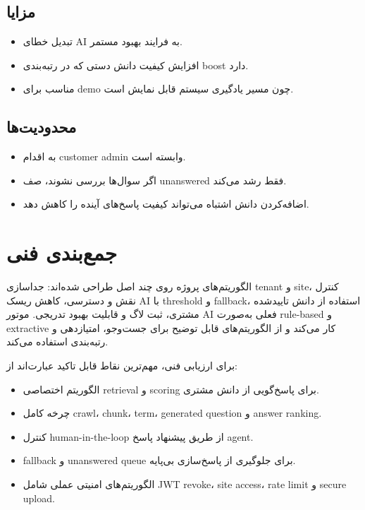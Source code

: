 \documentclass[12pt,a4paper]{article}
\newcommand{\en}[1]{\lr{#1}}
\begin{document}
\subsection{مزایا}
\begin{itemize}
  \item تبدیل خطای AI به فرایند بهبود مستمر.
  \item افزایش کیفیت دانش دستی که در رتبه‌بندی boost دارد.
  \item مناسب برای demo چون مسیر یادگیری سیستم قابل نمایش است.
\end{itemize}

\subsection{محدودیت‌ها}
\begin{itemize}
  \item به اقدام customer admin وابسته است.
  \item اگر سوال‌ها بررسی نشوند، صف unanswered فقط رشد می‌کند.
  \item اضافه‌کردن دانش اشتباه می‌تواند کیفیت پاسخ‌های آینده را کاهش دهد.
\end{itemize}

\section{جمع‌بندی فنی}
الگوریتم‌های پروژه \en{AI Chat SaaS} روی چند اصل طراحی شده‌اند: جداسازی tenant و site، کنترل نقش و دسترسی، کاهش ریسک AI با threshold و fallback، استفاده از دانش تاییدشده مشتری، ثبت لاگ و قابلیت بهبود تدریجی. موتور AI فعلی به‌صورت rule-based و extractive کار می‌کند و از الگوریتم‌های قابل توضیح برای جست‌وجو، امتیازدهی و رتبه‌بندی استفاده می‌کند.

برای ارزیابی فنی، مهم‌ترین نقاط قابل تاکید عبارت‌اند از:
\begin{itemize}
  \item الگوریتم اختصاصی retrieval و scoring برای پاسخ‌گویی از دانش مشتری.
  \item چرخه کامل crawl، chunk، term، generated question و answer ranking.
  \item کنترل human-in-the-loop از طریق پیشنهاد پاسخ agent.
  \item fallback و unanswered queue برای جلوگیری از پاسخ‌سازی بی‌پایه.
  \item الگوریتم‌های امنیتی عملی شامل JWT revoke، site access، rate limit و secure upload.
\end{itemize}
\end{document}
